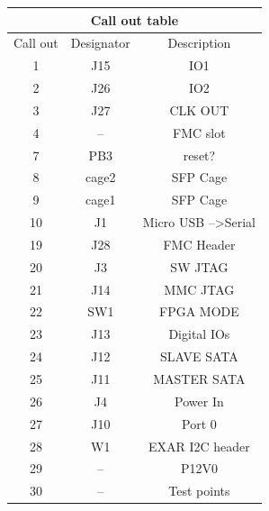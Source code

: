 \begin{longtable}{|c|c|c|} \hline
	\multicolumn{3}{|c|}{Call out table } \\ \hline	
	Call out & Designator & Description \\ \hline
	1 & J15 & IO1 \\ \hline
	2 & J26 & IO2 \\ \hline
	3 & J27 & CLK OUT \\ \hline
	4 & -- & FMC slot \\ \hline
	7 & PB3 & reset? \\ \hline
	8 & cage2 & SFP Cage \\ \hline
	9 & cage1 & SFP Cage \\ \hline
	10 & J1 & Micro USB -->Serial \\ \hline
	19 & J28 & FMC Header \\ \hline
	20 & J3 & SW JTAG \\ \hline
	21 & J14 & MMC JTAG \\ \hline
	22 & SW1 & FPGA MODE \\ \hline
	23 & J13 & Digital IOs \\ \hline
	24 & J12 & SLAVE SATA \\ \hline
	25 & J11 & MASTER SATA \\ \hline
	26 & J4 & Power In \\ \hline
	27 & J10 & Port 0 \\ \hline
	28 & W1 & EXAR I2C header \\ \hline
	29 & -- & P12V0 \\ \hline
	30 & -- &  Test points \\ \hline
\end{longtable}

